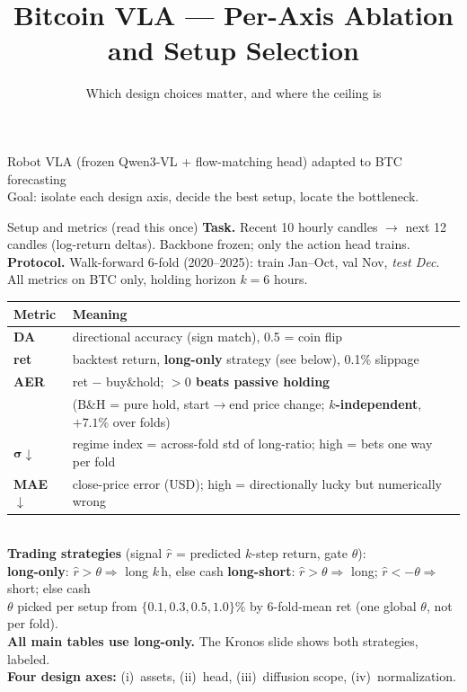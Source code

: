 \documentclass[10pt,aspectratio=169]{beamer}
\title{Bitcoin VLA --- Per-Axis Ablation and Setup Selection}
\subtitle{Which design choices matter, and where the ceiling is}
\date{}
\author{}
\newcommand{\gd}[1]{\textbf{\textcolor{good}{#1}}}
\newcommand{\bd}[1]{\textcolor{bad}{#1}}
\begin{document}
\begin{frame}
\titlepage
\vspace{-2em}
\begin{center}\footnotesize
Robot VLA (frozen Qwen3-VL + flow-matching head) adapted to BTC forecasting\\
Goal: isolate each design axis, decide the best setup, locate the bottleneck.
\end{center}
\end{frame}

\begin{frame}{Setup and metrics (read this once)}
\footnotesize
\textbf{Task.} Recent 10 hourly candles $\rightarrow$ next 12 candles (log-return deltas).
Backbone frozen; only the action head trains.\\[0.4em]
\textbf{Protocol.} Walk-forward 6-fold (2020--2025): train Jan--Oct, val Nov, \emph{test Dec}.
All metrics on BTC only, holding horizon $k{=}6$ hours.\\[0.6em]
\begin{tabular}{@{}ll@{}}
\toprule
Metric & Meaning \\ \midrule
\textbf{DA} & directional accuracy (sign match), 0.5 = coin flip \\
\textbf{ret} & backtest return, \textbf{long-only} strategy (see below), 0.1\% slippage \\
\textbf{AER} & ret $-$ buy\&hold; \gd{$>0$ beats passive holding} \\
 & (B\&H = pure hold, start$\to$end price change; \textbf{$k$-independent}, ${+}7.1\%$ over folds) \\
$\boldsymbol{\sigma}\downarrow$ & regime index = across-fold std of long-ratio; \bd{high = bets one way per fold} \\
\textbf{MAE}$\downarrow$ & close-price error (USD); \bd{high = directionally lucky but numerically wrong} \\
\bottomrule
\end{tabular}
\\[0.6em]
\textbf{Trading strategies} (signal $\hat r$ = predicted $k$-step return, gate $\theta$):\\
\quad\textbf{long-only}\;: $\hat r>\theta \Rightarrow$ long $k$\,h, else cash \hfill
\textbf{long-short}\;: $\hat r>\theta \Rightarrow$ long;\; $\hat r<-\theta \Rightarrow$ short; else cash\\
\quad$\theta$ picked per setup from $\{0.1,0.3,0.5,1.0\}\%$ by 6-fold-mean ret (one global $\theta$, not per fold).\\[0.4em]
\textbf{All main tables use long-only.} The Kronos slide shows both strategies, labeled.\\[0.4em]
\textbf{Four design axes:} (i)~assets, (ii)~head, (iii)~diffusion scope, (iv)~normalization.
\end{frame}
\end{document}

